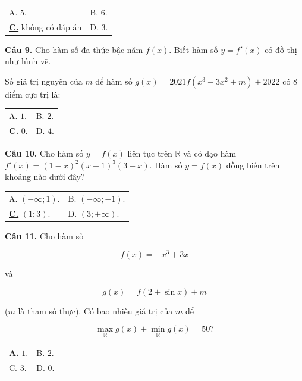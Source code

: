 \documentclass[12pt,a4paper]{article}
\makeatletter
\newcommand{\choiceA}[4]{

    \par\vspace{0.5em}\noindent

    \begin{tabularx}{\textwidth}{@{}X X@{}}

    \underline{\textbf{A.}} #1 & B. #2 \\[1.2em]

    C. #3 & D. #4

    \end{tabularx}

}
\newcommand{\choiceC}[4]{

    \par\vspace{0.5em}\noindent

    \begin{tabularx}{\textwidth}{@{}X X@{}}

    A. #1 & B. #2 \\[1.2em]

    \underline{\textbf{C.}} #3 & D. #4

    \end{tabularx}

}
\makeatother
\begin{document}
\choiceC{$5$.}{$6$.}{không có đáp án}{$3$.}



\textbf{Câu 9.} Cho hàm số đa thức bậc năm $f(x)$. Biết hàm số $y = f'(x)$ có đồ thị như hình vẽ.

\begin{center}


\end{center}

Số giá trị nguyên của $m$ để hàm số $g(x) = 2021f(x^3 - 3x^2 + m) + 2022$ có $8$ điểm cực trị là:

\choiceC{$1$.}{$2$.}{$0$.}{$4$.}



\textbf{Câu 10.} Cho hàm số $y=f(x)$ liên tục trên $\mathbb{R}$ và có đạo hàm $f'(x)=(1-x)^2(x+1)^3(3-x)$. Hàm số $y=f(x)$ đồng biến trên khoảng nào dưới đây?

\choiceC{$(-\infty; 1)$.}{$(-\infty; -1)$.}{$(1; 3)$.}{$(3; +\infty)$.}



\textbf{Câu 11.} Cho hàm số

\[

f(x) = -x^3 + 3x

\]

và

\[

g(x) = f(2 + \sin x) + m

\]

($m$ là tham số thực). Có bao nhiêu giá trị của $m$ để

\[

\max_{\mathbb{R}} g(x) + \min_{\mathbb{R}} g(x) = 50?

\]

\choiceA{$1$.}{$2$.}{$3$.}{$0$.}
\end{document}
